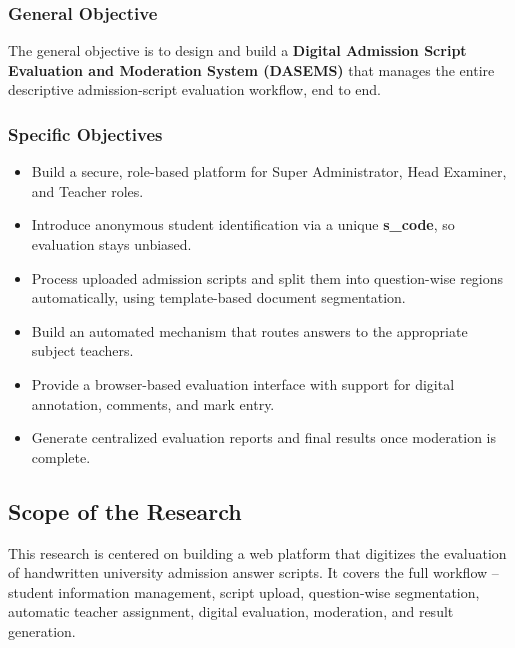 \subsubsection{General Objective}

The general objective is to design and build a \textbf{Digital Admission Script Evaluation and Moderation System (DASEMS)} that manages the entire descriptive admission-script evaluation workflow, end to end.

\subsubsection{Specific Objectives}

\begin{itemize}

\item Build a secure, role-based platform for Super Administrator, Head Examiner, and Teacher roles.

\item Introduce anonymous student identification via a unique \textbf{s\_code}, so evaluation stays unbiased.

\item Process uploaded admission scripts and split them into question-wise regions automatically, using template-based document segmentation.

\item Build an automated mechanism that routes answers to the appropriate subject teachers.

\item Provide a browser-based evaluation interface with support for digital annotation, comments, and mark entry.

\item Generate centralized evaluation reports and final results once moderation is complete.

\end{itemize}

\subsection{Scope of the Research}

This research is centered on building a web platform that digitizes the evaluation of handwritten university admission answer scripts. It covers the full workflow -- student information management, script upload, question-wise segmentation, automatic teacher assignment, digital evaluation, moderation, and result generation.

